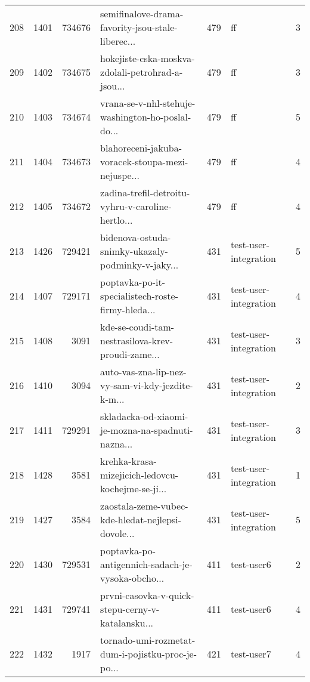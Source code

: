 \begin{tabular}{lrrlrlr}
208  &       1401 &   734676 &  semifinalove-drama-favority-jsou-stale-liberec... &      479 &                           ff &               3 \\
209  &       1402 &   734675 &  hokejiste-cska-moskva-zdolali-petrohrad-a-jsou... &      479 &                           ff &               3 \\
210  &       1403 &   734674 &  vrana-se-v-nhl-stehuje-washington-ho-poslal-do... &      479 &                           ff &               5 \\
211  &       1404 &   734673 &  blahoreceni-jakuba-voracek-stoupa-mezi-nejuspe... &      479 &                           ff &               4 \\
212  &       1405 &   734672 &  zadina-trefil-detroitu-vyhru-v-caroline-hertlo... &      479 &                           ff &               4 \\
213  &       1426 &   729421 &  bidenova-ostuda-snimky-ukazaly-podminky-v-jaky... &      431 &        test-user-integration &               5 \\
214  &       1407 &   729171 &  poptavka-po-it-specialistech-roste-firmy-hleda... &      431 &        test-user-integration &               4 \\
215  &       1408 &     3091 &  kde-se-coudi-tam-nestrasilova-krev-proudi-zame... &      431 &        test-user-integration &               3 \\
216  &       1410 &     3094 &  auto-vas-zna-lip-nez-vy-sam-vi-kdy-jezdite-k-m... &      431 &        test-user-integration &               2 \\
217  &       1411 &   729291 &  skladacka-od-xiaomi-je-mozna-na-spadnuti-nazna... &      431 &        test-user-integration &               3 \\
218  &       1428 &     3581 &  krehka-krasa-mizejicich-ledovcu-kochejme-se-ji... &      431 &        test-user-integration &               1 \\
219  &       1427 &     3584 &  zaostala-zeme-vubec-kde-hledat-nejlepsi-dovole... &      431 &        test-user-integration &               5 \\
220  &       1430 &   729531 &  poptavka-po-antigennich-sadach-je-vysoka-obcho... &      411 &                   test-user6 &               2 \\
221  &       1431 &   729741 &  prvni-casovka-v-quick-stepu-cerny-v-katalansku... &      411 &                   test-user6 &               4 \\
222  &       1432 &     1917 &  tornado-umi-rozmetat-dum-i-pojistku-proc-je-po... &      421 &                   test-user7 &               4 \\

\end{tabular}
